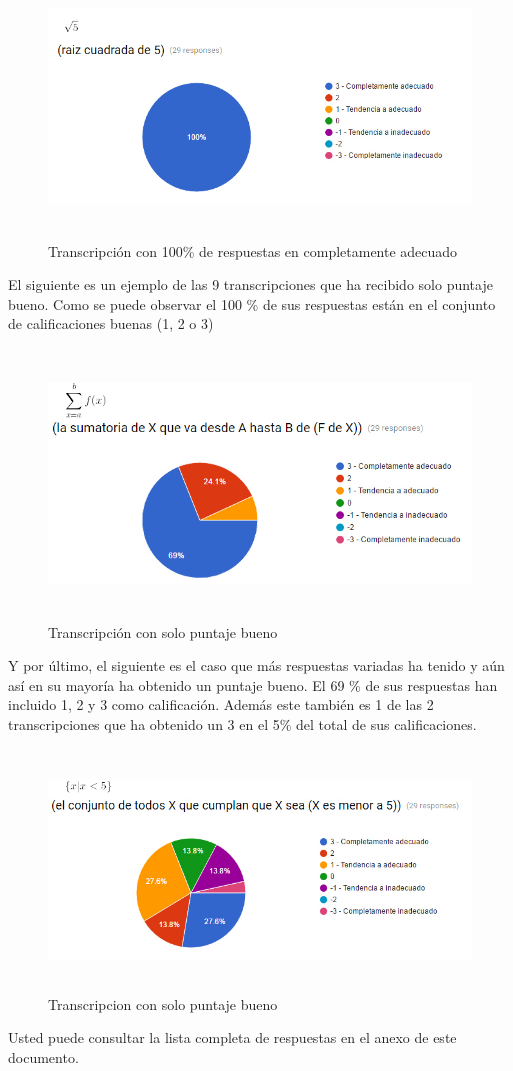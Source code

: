 \begin{figure}[H]
\centering
  \includegraphics[width=15cm, height=6.93cm]{Figures/captura2}
  \caption[]{Transcripción con 100\% de respuestas en completamente adecuado}
\label{fig:captura2}
\end{figure}

El siguiente es un ejemplo de las 9 transcripciones que ha recibido solo puntaje bueno. Como se puede observar el 100 \% de sus respuestas están en el conjunto de calificaciones buenas (1, 2 o 3)

\begin{figure}[H]
\centering
  \includegraphics[width=15cm, height=7.15cm]{Figures/captura1}
  \caption[]{Transcripción con solo puntaje bueno}
\label{fig:captura1}
\end{figure}

Y por último, el siguiente es el caso que más respuestas variadas ha tenido y aún así en su mayoría ha obtenido un puntaje bueno. El 69 \% de sus respuestas han incluido 1, 2 y 3 como calificación. Además este también es 1 de las 2 transcripciones que ha obtenido un 3 en el 5\% del total de sus calificaciones.

\begin{figure}[H]
\centering
  \includegraphics[width=15cm, height=6.39cm]{Figures/captura3}
  \caption[]{Transcripcion con solo puntaje bueno}
\label{fig:captura3}
\end{figure}

Usted puede consultar la lista completa de respuestas en el anexo de este documento.